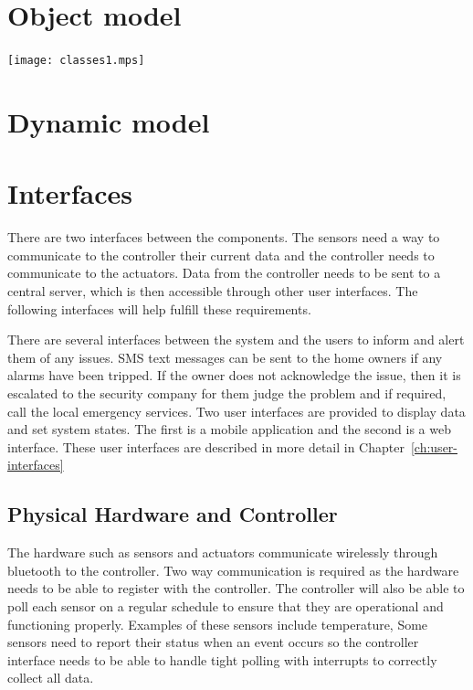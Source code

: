 \documentclass{report}
\begin{document}
\setlength{\parindent}{\originalParindent}
\setlength{\parskip}{\originalParskip}

\section{Object model}

\texttt{[image: classes1.mps]}

\section{Dynamic model}


\section{Interfaces}
There are two interfaces between the components. The sensors need a way to
communicate to the controller their current data and the controller needs to
communicate to the actuators. Data from the controller needs to be sent to a
central server, which is then accessible through other user interfaces. The following
interfaces will help fulfill these requirements.

There are several interfaces between the system and the users to inform and
alert them of any issues. SMS text messages can be sent to the home owners if
any alarms have been tripped. If the owner does not acknowledge the issue, then
it is escalated to the security company for them judge the problem and if required,
call the local emergency services. Two user interfaces are provided to display
data and set system states. The first is a mobile application and the second is
a web interface. These user interfaces are described in more detail in
Chapter~\ref{ch:user-interfaces}

\subsection{Physical Hardware and Controller}
The hardware such as sensors and actuators communicate wirelessly through
bluetooth to the controller. Two way communication is required as the hardware
needs to be able to register with the controller. The controller will also be
able to poll each sensor on a regular schedule to ensure that they are
operational and functioning properly. Examples of these sensors include
temperature, Some sensors need to report their status when an event occurs so
the controller interface needs to be able to handle tight polling with
interrupts to correctly collect all data.
\end{document}
